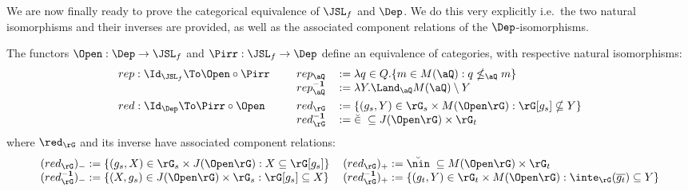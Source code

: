 \documentclass{article}
\begin{document}

We are now finally ready to prove the categorical equivalence of $\JSL_f$ and $\Dep$. We do this very explicitly i.e.\ the two natural isomorphisms and their inverses are provided, as well as the associated component relations of the $\Dep$-isomorphisms.

\bigskip

\begin{theorem}
\label{thm:bicliq_jirr_equivalent}
The functors $\Open : \Dep \to \JSL_f$ and $\Pirr : \JSL_f \to \Dep$ define an equivalence of categories, with respective natural isomorphisms:
\[
\begin{tabular}{llll}
$rep : \Id_{\JSL_f} \To \Open \circ \Pirr$
&&
$rep_\aQ$ & $:= \lambda q \in Q.\{ m \in M(\aQ) : q \nleq_\aQ m \}$
\\
&& $rep_\aQ^{\bf-1}$ & $:= \lambda Y. \Land_\aQ M(\aQ) \setminus Y$
\\[1ex]
$red : \Id_{\Dep} \To \Pirr \circ \Open$
&&
$red_\rG$ & $:= \{ (g_s,Y) \in \rG_s \times M(\Open\rG) : \rG[g_s] \nsubseteq Y \}$ 
\\
&&
$red_\rG^{\bf-1}$ & $:= \breve{\in} \; \subseteq J(\Open\rG) \times \rG_t$
\end{tabular}
\]
where $\red_\rG$ and its inverse have associated component relations:
\[
\begin{tabular}{ll}
$(red_\rG)_- := \{ (g_s,X) \in \rG_s \times J(\Open\rG) : X \subseteq \rG[g_s] \}$
&
$(red_\rG)_+ := \breve{\nin} \; \subseteq  M(\Open\rG) \times \rG_t$
\\
$(red_\rG^{\bf-1})_- := \{ (X,g_s) \in J(\Open\rG)\times\rG_s : \rG[g_s] \subseteq X \}$
&
$(red_\rG^{\bf-1})_+ := \{ (g_t,Y) \in \rG_t \times M(\Open\rG) : \inte_\rG(\overline{g_t}) \subseteq Y  \}$
\end{tabular}
\]
\end{theorem}
\end{document}
